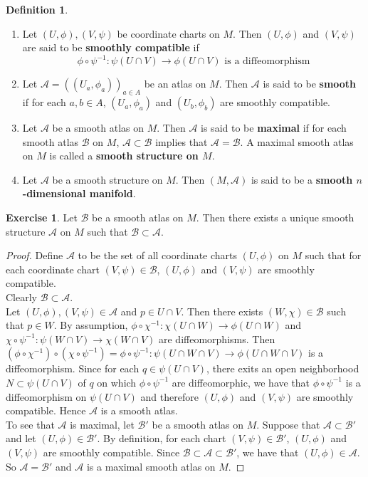 \documentclass[12pt]{amsart}
\theoremstyle{definition}
\newtheorem{defn}[definition]{Definition}
\theoremstyle{definition}
\newtheorem{ex}[definition]{Exercise}
\newcommand{\MA}{\mathcal{A}}
\newcommand{\MB}{\mathcal{B}}
\begin{document}
	\begin{defn}\
		\begin{enumerate}
			\item Let $(U, \phi), (V, \psi)$ be coordinate charts on $M$. Then $(U, \phi)$ and $(V, \psi)$ are said to be \textbf{smoothly compatible} if $$\phi \circ \psi^{-1}: \psi(U \cap V) \rightarrow \phi (U \cap V) \text{ is a diffeomorphism}$$ 
			\item Let $\MA = ((U_a,\phi_{a}))_{a \in A}$ be an atlas on $M$. Then $\MA$ is said to be \textbf{smooth} if for each $a,b \in A$, $(U_a,\phi_{a})$ and $(U_b,\phi_{b})$ are smoothly compatible.
			\item Let $\MA$ be a smooth atlas on $M$. Then $\MA$ is said to be \textbf{maximal} if for each smooth atlas $\MB$ on $M$, $\MA \subset \MB$ implies that $\MA = \MB$. A maximal smooth atlas on $M$ is called a \textbf{smooth structure on $M$}.
			\item Let $\MA$ be a smooth structure on $M$. Then $(M, \MA)$ is said to be a \textbf{smooth $n$-dimensional manifold}. 
		\end{enumerate}
	\end{defn}

	\begin{ex}
		Let $\MB$ be a smooth atlas on $M$. Then there exists a unique smooth structure $\MA$ on $M$ such that $\MB \subset \MA$.
	\end{ex}

	\begin{proof}
		Define $\MA$ to be the set of all coordinate charts $(U, \phi)$ on $M$ such that for each coordinate chart $(V, \psi) \in \MB$,  $(U, \phi)$ and $(V, \psi) $ are smoothly compatible. \\
		Clearly $\MB \subset \MA$. \\
		Let $(U, \phi), (V, \psi) \in \MA$ and $p \in U \cap V$. Then there exists $(W, \chi) \in \MB$ such that $p \in W$. By assumption, $\phi \circ \chi^{-1} : \chi(U \cap W) \rightarrow \phi(U \cap W)$ and $ \chi \circ \psi^{-1} : \psi(W \cap V) \rightarrow \chi(W \cap V)$ are diffeomorphisms. Then $ (\phi \circ \chi^{-1}) \circ (\chi \circ \psi^{-1}) = \phi \circ \psi^{-1}: \psi(U \cap W \cap V) \rightarrow  \phi(U \cap W \cap V) $ is a diffeomorphism.  Since for each $q \in \psi(U \cap V)$, there exits an open neighborhood $N \subset \psi(U \cap V)$ of $q$ on which $\phi \circ \psi^{-1}$ are diffeomorphic, we have that $\phi \circ \psi^{-1}$ is a diffeomorphism on $\psi(U \cap V)$ and therefore $(U, \phi)$ and $ (V, \psi)$ are smoothly compatible. Hence $\MA$ is a smooth atlas.\\
		To see that $\MA$ is maximal, let $\MB'$ be a smooth atlas on $M$. Suppose that $\MA \subset \MB'$ and let $(U, \phi) \in \MB'$. By definition, for each chart $(V, \psi) \in \MB'$, $(U, \phi)$ and $(V, \psi)$ are smoothly compatible. Since $\MB \subset \MA \subset \MB'$, we have that $(U, \phi) \in \MA$. So $\MA = \MB'$ and $\MA$ is a maximal smooth atlas on $M$.
	\end{proof}
\end{document}
